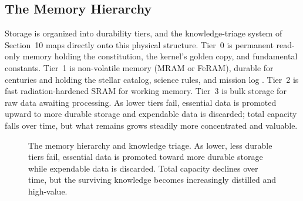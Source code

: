 \documentclass[10pt, a4paper]{article}
\begin{document}
\subsection{The Memory Hierarchy}

Storage is organized into durability tiers, and the knowledge-triage system of Section~10 maps directly onto this physical structure. Tier~0 is permanent read-only memory holding the constitution, the kernel's golden copy, and fundamental constants. Tier~1 is non-volatile memory (MRAM or FeRAM), durable for centuries and holding the stellar catalog, science rules, and mission log \cite{gerardin2010}. Tier~2 is fast radiation-hardened SRAM for working memory. Tier~3 is bulk storage for raw data awaiting processing. As lower tiers fail, essential data is promoted upward to more durable storage and expendable data is discarded; total capacity falls over time, but what remains grows steadily more concentrated and valuable.

\begin{figure}[ht]
\centering
{}
\caption{The memory hierarchy and knowledge triage. As lower, less durable tiers fail, essential data is promoted toward more durable storage while expendable data is discarded. Total capacity declines over time, but the surviving knowledge becomes increasingly distilled and high-value.}
\label{fig:memory}
\end{figure}
\end{document}
